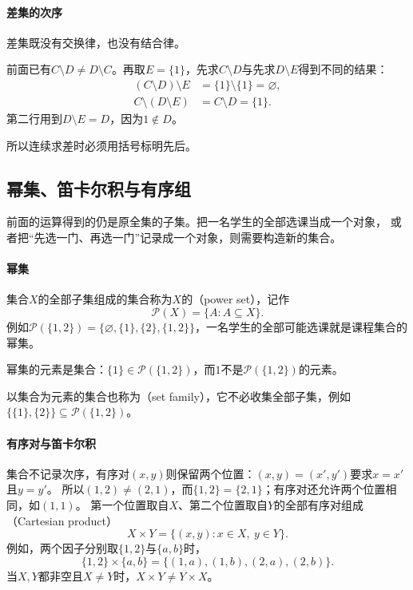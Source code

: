 \paragraph{差集的次序}
差集既没有交换律，也没有结合律。
\begin{example}[差集不满足交换律与结合律]
\label{ex:sets-difference-order}
前面已有$C\setminus D\neq D\setminus C$。再取$E=\{1\}$，先求$C\setminus D$与先求$D\setminus E$得到不同的结果：
\[
 \begin{aligned}
  (C\setminus D)\setminus E&=\{1\}\setminus\{1\}=\varnothing,\\
  C\setminus(D\setminus E)&=C\setminus D=\{1\}.
 \end{aligned}
\]
第二行用到$D\setminus E=D$，因为$1\notin D$。
\end{example}
所以连续求差时必须用括号标明先后。

\subsection{幂集、笛卡尔积与有序组}
\label{sec:sets-power-sets-products}

前面的运算得到的仍是原全集的子集。把一名学生的全部选课当成一个对象，
或者把“先选一门、再选一门”记录成一个对象，则需要构造新的集合。

\paragraph{幂集}
集合$X$的全部子集组成的集合称为$X$的（power set），记作
\[
 \mathcal P(X)=\{A:A\subseteq X\}.
\]
例如$\mathcal P(\{1,2\})=\{\varnothing,\{1\},\{2\},\{1,2\}\}$，一名学生的全部可能选课就是课程集合的幂集。

幂集的元素是集合：$\{1\}\in\mathcal P(\{1,2\})$，而$1$不是$\mathcal P(\{1,2\})$的元素。

以集合为元素的集合也称为（set family），它不必收集全部子集，例如$\{\{1\},\{2\}\}\subseteq\mathcal P(\{1,2\})$。

\paragraph{有序对与笛卡尔积}
集合不记录次序，有序对$(x,y)$则保留两个位置：$(x,y)=(x',y')$要求$x=x'$且$y=y'$。
所以$(1,2)\neq(2,1)$，而$\{1,2\}=\{2,1\}$；有序对还允许两个位置相同，如$(1,1)$。
第一个位置取自$X$、第二个位置取自$Y$的全部有序对组成（Cartesian product）
\begin{equation}
 X\times Y=\{(x,y):x\in X,\ y\in Y\}.
 \label{eq:sets-cartesian-product}
\end{equation}
例如，两个因子分别取$\{1,2\}$与$\{a,b\}$时，
\[
 \{1,2\}\times\{a,b\}=\{(1,a),(1,b),(2,a),(2,b)\}.
\]
当$X,Y$都非空且$X\neq Y$时，$X\times Y\neq Y\times X$。

